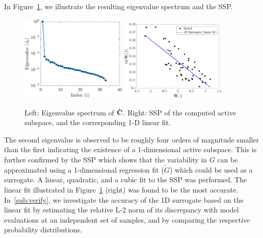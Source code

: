 In Figure~\ref{fig:hd}, we illustrate the resulting eigenvalue spectrum and the SSP.
%
\begin{figure}[htbp]
 \begin{center}
   \includegraphics[width=0.45\textwidth]{./Figures/eig_33D}
   \includegraphics[width=0.45\textwidth]{./Figures/ssp_33D}
\caption{Left: Eigenvalue spectrum of $\hat{\mathbf{{C}}}$. Right: SSP of the computed active subspace, and the
corresponding 1-D linear fit.} 
\label{fig:hd}
\end{center}
\end{figure}
%
The second eigenvalue is observed to be roughly four orders of magnitude smaller than the first 
indicating the existence of a 1-dimensional active subspace. This is further confirmed by the SSP
 which shows that the variability in $G$ can be approximated using a 1-dimensional regression
fit ($\tilde{G}$) which could be used as a surrogate. A linear, quadratic, and a cubic fit to the SSP was performed.
The linear fit illustrated in Figure~\ref{fig:hd} (right) was found to be the most accurate. In~\ref{sub:verify},
we investigate the accuracy of the 1D surrogate based on the linear fit by estimating the relative L-2
norm of its discrepancy with model evaluations at an independent set of samples, and by comparing the
respective probability distributions.

